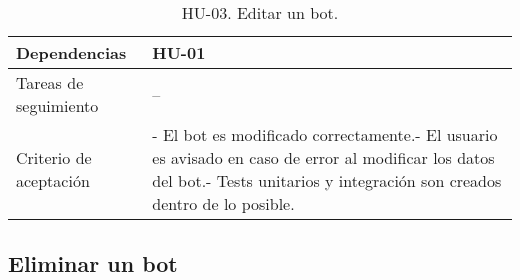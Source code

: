 \begin{table}[H]
\begin{adjustbox}{max width=\textwidth}
\begin{tabularx}{\textwidth}{l|L}
        Dependencias & HU-01 \\ \hline
        Tareas de seguimiento & – \\ \hline
        Criterio de aceptación & - El bot es modificado correctamente.\linebreak - El usuario es avisado en caso de error al modificar los datos del bot.\linebreak - Tests unitarios y integración son creados dentro de lo posible. \\ \hline
    \end{tabularx}
    \end{adjustbox}
    \caption{HU-03. Editar un bot.}
\end{table}

\subsection{Eliminar un bot}

